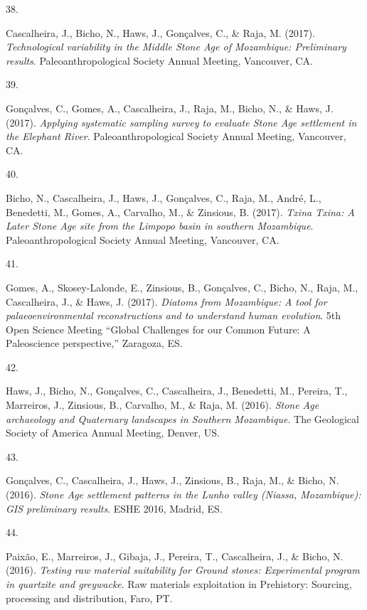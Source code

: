 \documentclass[11pt,a4paper,]{awesome-cv}
\newlength{\cslhangindent}
\newlength{\csllabelwidth}
\newenvironment{CSLReferences}[2] %
 {\begin{list}{}{%
  \setlength{\itemindent}{0pt}
  \setlength{\leftmargin}{0pt}
  \setlength{\parsep}{0pt}
  \ifodd #1
   \setlength{\leftmargin}{\cslhangindent}
   \setlength{\itemindent}{-1\cslhangindent}
  \fi
  \setlength{\itemsep}{#2\baselineskip}}}
 {\end{list}}
\newcommand{\CSLLeftMargin}[1]{\parbox[t]{\csllabelwidth}{\strut#1\strut}}
\newcommand{\CSLRightInline}[1]{\parbox[t]{\linewidth - \csllabelwidth}{\strut#1\strut}}
\begin{document}
\begin{CSLReferences}{0}{0}
\CSLLeftMargin{38. }%
\CSLRightInline{Cascalheira, J., Bicho, N., Haws, J., Gonçalves, C., \&
Raja, M. (2017). \emph{Technological variability in the Middle Stone Age
of Mozambique: Preliminary results}. Paleoanthropological Society Annual
Meeting, Vancouver, CA.}

\CSLLeftMargin{39. }%
\CSLRightInline{Gonçalves, C., Gomes, A., Cascalheira, J., Raja, M.,
Bicho, N., \& Haws, J. (2017). \emph{Applying systematic sampling survey
to evaluate Stone Age settlement in the Elephant River}.
Paleoanthropological Society Annual Meeting, Vancouver, CA.}

\CSLLeftMargin{40. }%
\CSLRightInline{Bicho, N., Cascalheira, J., Haws, J., Gonçalves, C.,
Raja, M., André, L., Benedetti, M., Gomes, A., Carvalho, M., \&
Zinsious, B. (2017). \emph{Txina Txina: A Later Stone Age site from the
Limpopo basin in southern Mozambique}. Paleoanthropological Society
Annual Meeting, Vancouver, CA.}

\CSLLeftMargin{41. }%
\CSLRightInline{Gomes, A., Skosey-Lalonde, E., Zinsious, B., Gonçalves,
C., Bicho, N., Raja, M., Cascalheira, J., \& Haws, J. (2017).
\emph{Diatoms from Mozambique: A tool for palaeoenvironmental
reconstructions and to understand human evolution}. 5th Open Science
Meeting {``Global Challenges for our Common Future: A Paleoscience
perspective,''} Zaragoza, ES.}

\CSLLeftMargin{42. }%
\CSLRightInline{Haws, J., Bicho, N., Gonçalves, C., Cascalheira, J.,
Benedetti, M., Pereira, T., Marreiros, J., Zinsious, B., Carvalho, M.,
\& Raja, M. (2016). \emph{Stone Age archaeology and Quaternary
landscapes in Southern Mozambique}. The Geological Society of America
Annual Meeting, Denver, US.}

\CSLLeftMargin{43. }%
\CSLRightInline{Gonçalves, C., Cascalheira, J., Haws, J., Zinsious, B.,
Raja, M., \& Bicho, N. (2016). \emph{Stone Age settlement patterns in
the Lunho valley (Niassa, Mozambique): GIS preliminary results}. ESHE
2016, Madrid, ES.}

\CSLLeftMargin{44. }%
\CSLRightInline{Paixão, E., Marreiros, J., Gibaja, J., Pereira, T.,
Cascalheira, J., \& Bicho, N. (2016). \emph{Testing raw material
suitability for Ground stones: Experimental program in quartzite and
greywacke}. Raw materials exploitation in Prehistory: Sourcing,
processing and distribution, Faro, PT.}


\end{CSLReferences}
\end{document}
